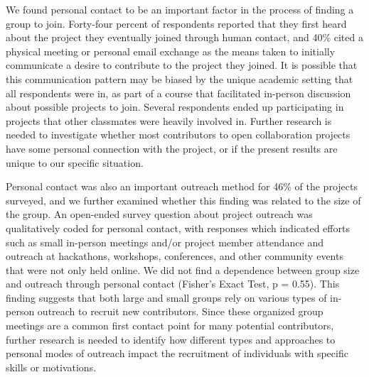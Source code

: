We found personal contact to be an important factor in the process of finding a group to join. Forty-four percent of respondents reported that they first heard about the project they eventually joined through human contact, and 40\% cited a physical meeting or personal email exchange as the means taken to initially communicate a desire to contribute to the project they joined. It is possible that this communication pattern may be biased by the unique academic setting that all respondents were in, as part of a course that facilitated in-person discussion about possible projects to join. Several respondents ended up participating in projects that other classmates were heavily involved in. Further research is needed to investigate whether most contributors to open collaboration projects have some personal connection with the project, or if the present results are unique to our specific situation.

Personal contact was also an important outreach method for 46\% of the projects surveyed, and we further examined whether this finding was related to the size of the group. An open-ended survey question about project outreach was qualitatively coded for personal contact, with responses which indicated efforts such as small in-person meetings and/or project member attendance and outreach at hackathons, workshops, conferences, and other community events that were not only held online. We did not find a dependence between group size and outreach through personal contact (Fisher’s Exact Test, p = 0.55). This finding suggests that both large and small groups rely on various types of in-person outreach to recruit new contributors. Since these organized group meetings are a common first contact point for many potential contributors, further research is needed to identify how different types and approaches to personal modes of outreach impact the recruitment of individuals with specific skills or motivations.